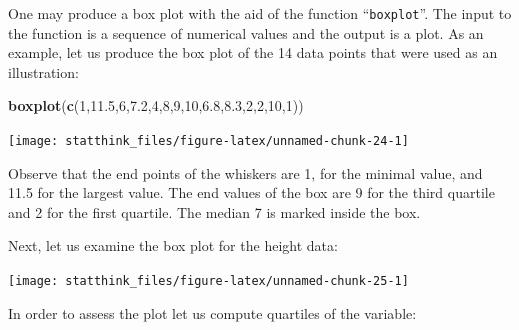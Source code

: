 \documentclass[]{krantz}
\makeatletter
\newenvironment{Shaded}{\begin{snugshade}}{\end{snugshade}}
\newcommand{\DecValTok}[1]{\textcolor[rgb]{0.00,0.00,0.81}{#1}}
\newcommand{\FloatTok}[1]{\textcolor[rgb]{0.00,0.00,0.81}{#1}}
\newcommand{\KeywordTok}[1]{\textcolor[rgb]{0.13,0.29,0.53}{\textbf{#1}}}
\newcommand{\NormalTok}[1]{#1}
\newcommand{\OperatorTok}[1]{\textcolor[rgb]{0.81,0.36,0.00}{\textbf{#1}}}
\newenvironment{kframe}{%
\medskip{}
\setlength{\fboxsep}{.8em}
 \def\at@end@of@kframe{}%
 \ifinner\ifhmode%
  \def\at@end@of@kframe{\end{minipage}}%
  \begin{minipage}{\columnwidth}%
 \fi\fi%
 \def\FrameCommand##1{\hskip\@totalleftmargin \hskip-\fboxsep
 \colorbox{shadecolor}{##1}\hskip-\fboxsep
     \hskip-\linewidth \hskip-\@totalleftmargin \hskip\columnwidth}%
 \MakeFramed {\advance\hsize-\width
   \@totalleftmargin\z@ \linewidth\hsize
   \@setminipage}}%
 {\par\unskip\endMakeFramed%
 \at@end@of@kframe}
\renewenvironment{Shaded}{\begin{kframe}}{\end{kframe}}
\theoremstyle{definition}
\theoremstyle{definition}
\theoremstyle{definition}
\theoremstyle{remark}
\makeatother
\begin{document}
One may produce a box plot with the aid of the function ``\texttt{boxplot}''. The
input to the function is a sequence of numerical values and the output
is a plot. As an example, let us produce the box plot of the 14 data
points that were used as an illustration:

\begin{Shaded}
\begin{Highlighting}[]
\KeywordTok{boxplot}\NormalTok{(}\KeywordTok{c}\NormalTok{(}\DecValTok{1}\NormalTok{,}\FloatTok{11.5}\NormalTok{,}\DecValTok{6}\NormalTok{,}\FloatTok{7.2}\NormalTok{,}\DecValTok{4}\NormalTok{,}\DecValTok{8}\NormalTok{,}\DecValTok{9}\NormalTok{,}\DecValTok{10}\NormalTok{,}\FloatTok{6.8}\NormalTok{,}\FloatTok{8.3}\NormalTok{,}\DecValTok{2}\NormalTok{,}\DecValTok{2}\NormalTok{,}\DecValTok{10}\NormalTok{,}\DecValTok{1}\NormalTok{))}
\end{Highlighting}
\end{Shaded}

\begin{center}\texttt{[image: statthink\_files/figure-latex/unnamed-chunk-24-1]} \end{center}

Observe that the end points of the
whiskers are 1, for the minimal value, and 11.5 for the largest value.
The end values of the box are 9 for the third quartile and 2 for the
first quartile. The median 7 is marked inside the box.

Next, let us examine the box plot for the height data:

\begin{Shaded}
\end{Shaded}

\begin{center}\texttt{[image: statthink\_files/figure-latex/unnamed-chunk-25-1]} \end{center}

In order to assess the plot let us compute quartiles of the variable:

\begin{Shaded}
\end{Shaded}
\end{document}
